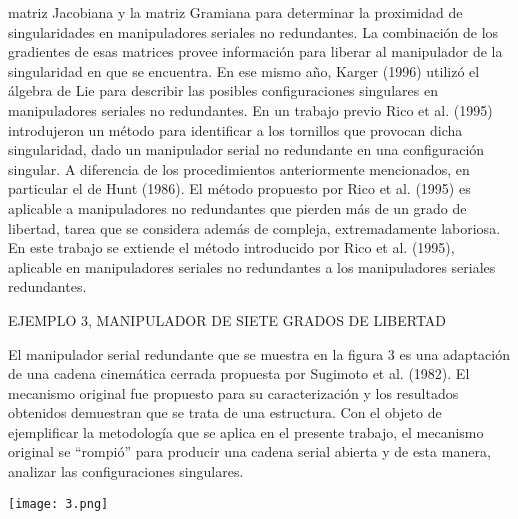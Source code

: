 \documentclass[12pt,a4paper]{article}
\begin{document}
matriz Jacobiana y la matriz Gramiana para
determinar la proximidad de singularidades en
manipuladores seriales no redundantes. La combinación de los gradientes de esas matrices
provee información para liberar al manipulador
de la singularidad en que se encuentra. En ese
mismo año, Karger (1996) utilizó el álgebra de
Lie para describir las posibles configuraciones
singulares en manipuladores seriales no redundantes.
En un trabajo previo Rico et al. (1995) introdujeron un método para identificar a los tornillos que
provocan dicha singularidad, dado un manipulador
serial no redundante en una configuración singular.
A diferencia de los procedimientos anteriormente
mencionados, en particular el de Hunt (1986). El
método propuesto por Rico et al. (1995) es aplicable a manipuladores no redundantes que pierden
más de un grado de libertad, tarea que se considera
además de compleja, extremadamente laboriosa.
En este trabajo se extiende el método introducido por Rico et al. (1995), aplicable en manipuladores seriales no redundantes a los manipuladores seriales redundantes.





 EJEMPLO 3, MANIPULADOR DE
SIETE GRADOS DE LIBERTAD

El manipulador serial redundante que se muestra
en la figura 3 es una adaptación de una cadena
cinemática cerrada propuesta por Sugimoto et al.
(1982). El mecanismo original fue propuesto
para su caracterización y los resultados obtenidos
demuestran que se trata de una estructura.
Con el objeto de ejemplificar la metodología que
se aplica en el presente trabajo, el mecanismo
original se “rompió” para producir una cadena
serial abierta y de esta manera, analizar las configuraciones singulares.

\texttt{[image: 3.png]}
\end{document}
